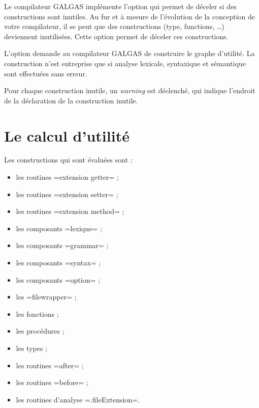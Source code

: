 

Le compilateur GALGAS implémente l'option  qui permet de déceler si des constructions sont inutiles. Au fur et à mesure de l'évolution de la conception de votre compilateur, il se peut que des constructions (type, functions, …) deviennent inutilisées. Cette option permet de déceler ces constructions.

L'option  demande au compilateur GALGAS de construire le graphe d'utilité. La construction n'est entreprise que si analyse lexicale, syntaxique et sémantique sont effectuées sans erreur.

Pour chaque construction inutile, un \emph{warning} est déclenché, qui indique l'endroit de la déclaration de la construction inutile.



\section{Le calcul d'utilité}

Les constructions qui sont évaluées sont :
\begin{itemize}
  \item les routines \ggs=extension getter= ;
  \item les routines \ggs=extension setter= ;
  \item les routines \ggs=extension method= ;
  \item les composants \ggs=lexique= ;
  \item les composants \ggs=grammar= ;
  \item les composants \ggs=syntax= ;
  \item les composants \ggs=option= ;
  \item les \ggs=filewrapper= ;
  \item les fonctions ;
  \item les procédures ;
  \item les types ;
  \item les routines \ggs=after= ;
  \item les routines \ggs=before= ;
  \item les routines d'analyse \ggs=.fileExtension=.
\end{itemize}

